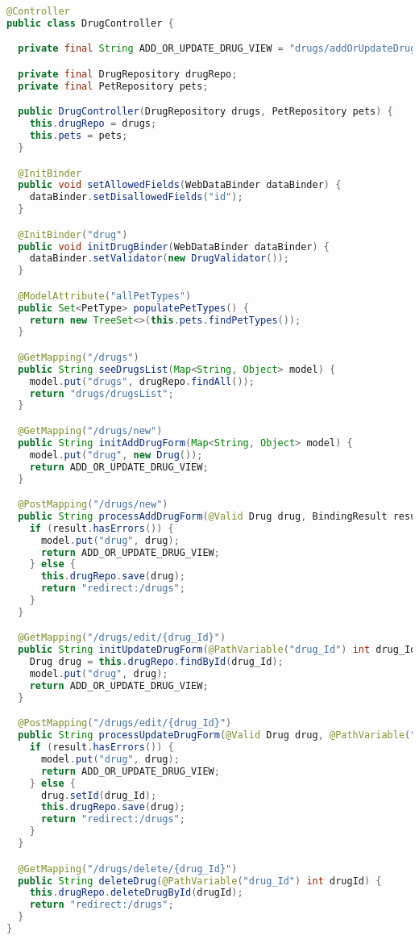 \documentclass[12pt, a4paper]{article}
\begin{document}
\begin{lstlisting}[language=Java, title='DrugController.java']
@Controller
public class DrugController {

  private final String ADD_OR_UPDATE_DRUG_VIEW = "drugs/addOrUpdateDrug";

  private final DrugRepository drugRepo;
  private final PetRepository pets;

  public DrugController(DrugRepository drugs, PetRepository pets) {
    this.drugRepo = drugs;
    this.pets = pets;
  }

  @InitBinder
  public void setAllowedFields(WebDataBinder dataBinder) {
    dataBinder.setDisallowedFields("id");
  }

  @InitBinder("drug")
  public void initDrugBinder(WebDataBinder dataBinder) {
    dataBinder.setValidator(new DrugValidator());
  }

  @ModelAttribute("allPetTypes")
  public Set<PetType> populatePetTypes() {
    return new TreeSet<>(this.pets.findPetTypes());
  }

  @GetMapping("/drugs")
  public String seeDrugsList(Map<String, Object> model) {
    model.put("drugs", drugRepo.findAll());
    return "drugs/drugsList";
  }

  @GetMapping("/drugs/new")
  public String initAddDrugForm(Map<String, Object> model) {
    model.put("drug", new Drug());
    return ADD_OR_UPDATE_DRUG_VIEW;
  }

  @PostMapping("/drugs/new")
  public String processAddDrugForm(@Valid Drug drug, BindingResult result, Map<String, Object> model) {
    if (result.hasErrors()) {
      model.put("drug", drug);
      return ADD_OR_UPDATE_DRUG_VIEW;
    } else {
      this.drugRepo.save(drug);
      return "redirect:/drugs";
    }
  }

  @GetMapping("/drugs/edit/{drug_Id}")
  public String initUpdateDrugForm(@PathVariable("drug_Id") int drug_Id, Map<String, Object> model) {
    Drug drug = this.drugRepo.findById(drug_Id);
    model.put("drug", drug);
    return ADD_OR_UPDATE_DRUG_VIEW;
  }

  @PostMapping("/drugs/edit/{drug_Id}")
  public String processUpdateDrugForm(@Valid Drug drug, @PathVariable("drug_Id") int drug_Id, BindingResult result, Map<String, Object> model) {
    if (result.hasErrors()) {
      model.put("drug", drug);
      return ADD_OR_UPDATE_DRUG_VIEW;
    } else {
      drug.setId(drug_Id);
      this.drugRepo.save(drug);
      return "redirect:/drugs";
    }
  }

  @GetMapping("/drugs/delete/{drug_Id}")
  public String deleteDrug(@PathVariable("drug_Id") int drugId) {
    this.drugRepo.deleteDrugById(drugId);
    return "redirect:/drugs";
  }
}
\end{lstlisting}
\end{document}
